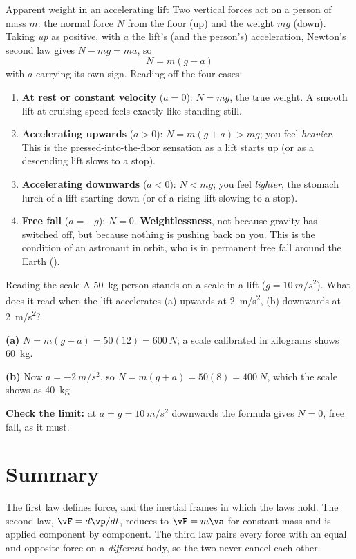 \begin{derivbox}{Apparent weight in an accelerating lift}
Two vertical forces act on a person of mass $m$: the normal force $N$ from the floor (up) and the weight
$mg$ (down). Taking \emph{up} as positive, with $a$ the lift's (and the person's) acceleration, Newton's
second law gives
$N-mg=ma$, so
\[
\boxed{\;N=m(g+a)\;}
\]
with $a$ carrying its own sign. Reading off the four cases:
\begin{enumerate}
\item \textbf{At rest or constant velocity} ($a=0$): $N=mg$, the true weight. A smooth lift at
      cruising speed feels exactly like standing still.
\item \textbf{Accelerating upwards} ($a>0$): $N=m(g+a)>mg$; you feel \emph{heavier}. This is the
      pressed-into-the-floor sensation as a lift starts up (or as a descending lift slows to a stop).
\item \textbf{Accelerating downwards} ($a<0$): $N<mg$; you feel \emph{lighter}, the stomach lurch of a
      lift starting down (or of a rising lift slowing to a stop).
\item \textbf{Free fall} ($a=-g$): $N=0$. \textbf{Weightlessness}, not because gravity has switched
      off, but because nothing is pushing back on you. This is the condition of an astronaut in orbit,
      who is in permanent free fall around the Earth ().
\end{enumerate}
\end{derivbox}

\begin{exbox}{Reading the scale}
A \SI{50}{kg} person stands on a scale in a lift ($g=\SI{10}{m/s^2}$). What does it read when the lift
accelerates (a) upwards at \SI{2}{m/s^2}, (b) downwards at \SI{2}{m/s^2}?

 \textbf{(a)} $N=m(g+a)=50(12)=\SI{600}{N}$; a scale calibrated in kilograms shows
\SI{60}{kg}.

 \textbf{(b)} Now $a=\SI{-2}{m/s^2}$, so $N=m(g+a)=50(8)=\SI{400}{N}$, which the scale shows
as \SI{40}{kg}.

 \textbf{Check the limit:} at $a=g=\SI{10}{m/s^2}$ downwards the formula gives $N=0$, free
fall, as it must. 
\end{exbox}

\section{Summary}\label{sec:summary7}
The first law defines force, and the inertial frames in which the laws hold. The second law,
$\vF=d\vp/dt$, reduces to $\vF=m\va$ for constant mass and is applied component by component. The third
law pairs every force with an equal and opposite force on a \emph{different} body, so the two never
cancel each other.

